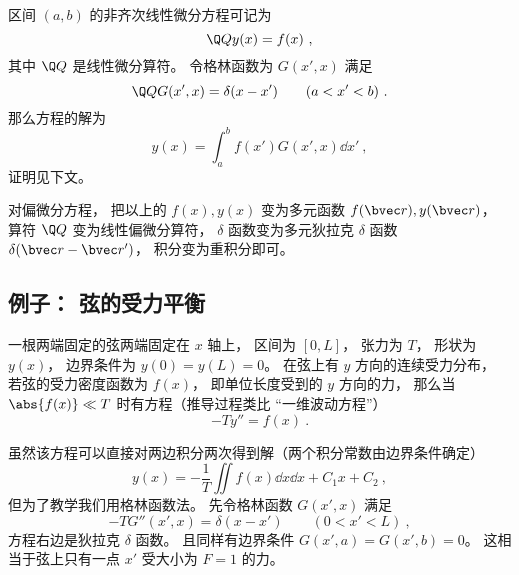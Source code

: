 

区间 $(a,b)$ 的非齐次线性微分方程可记为
\begin{equation}\label{eq_GreenF_5}
\Q Q y(x) = f(x)~,
\end{equation}
其中 $\Q Q$ 是线性微分算符。 令格林函数为 $G(x', x)$ 满足
\begin{equation}\label{eq_GreenF_7}
\Q Q G(x', x) = \delta(x - x') \qquad (a < x' < b)~.
\end{equation}
那么方程的解为
\begin{equation}\label{eq_GreenF_4}
y(x) = \int_a^b f(x') G(x', x) \dd{x'}~,
\end{equation}
证明见下文。

对偏微分方程， 把以上的 $f(x), y(x)$ 变为多元函数 $f(\bvec r), y(\bvec r)$， 算符 $\Q Q$ 变为线性偏微分算符， $\delta$ 函数变为多元狄拉克 $\delta$ 函数 $\delta(\bvec r - \bvec r')$， 积分变为重积分即可。

\subsection{例子： 弦的受力平衡}

一根两端固定的弦两端固定在 $x$ 轴上， 区间为 $[0, L]$， 张力为 $T$， 形状为 $y(x)$， 边界条件为 $y(0) = y(L) = 0$。 在弦上有 $y$ 方向的连续受力分布， 若弦的受力密度函数为 $f(x)$， 即单位长度受到的 $y$ 方向的力， 那么当 $\abs{f(x)} \ll T$ 时有方程（推导过程类比 “一维波动方程”）
\begin{equation}\label{eq_GreenF_1}
-T y'' = f(x)~.
\end{equation}

虽然该方程可以直接对两边积分两次得到解（两个积分常数由边界条件确定）
\begin{equation}\label{eq_GreenF_14}
y(x) = -\frac{1}{T}\iint f(x) \dd{x}\dd{x} + C_1 x + C_2~,
\end{equation}
但为了教学我们用格林函数法。 先令格林函数 $G(x', x)$ 满足
\begin{equation}\label{eq_GreenF_2}
-T G''(x', x) = \delta(x - x') \qquad (0 < x' < L)~,
\end{equation}
方程右边是狄拉克 $\delta$ 函数。 且同样有边界条件 $G(x', a) = G(x', b) = 0$。 这相当于弦上只有一点 $x'$ 受大小为 $F = 1$ 的力。

